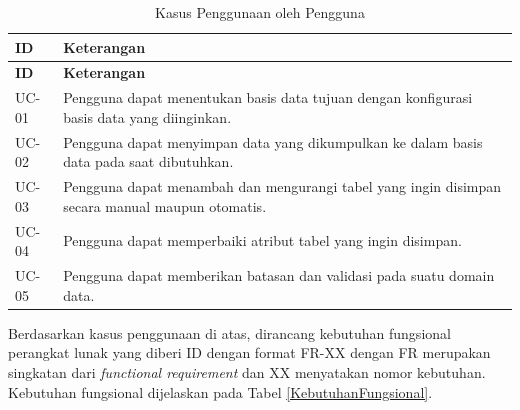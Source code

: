 	\begin{small}
	\begin{longtable}{ | p{2cm} | p{10cm} | }
	    \caption{Kasus Penggunaan oleh Pengguna}
	    \label{KebutuhanPengguna}\\ \hline
	    \centering\bfseries{ID} & \centering\bfseries{Keterangan} \tabularnewline \hline
	    \endfirsthead
	    \hline
	    \centering\bfseries{ID} & \centering\bfseries{Keterangan} \tabularnewline \hline
	    \endhead
	    UC-01 & Pengguna dapat menentukan basis data tujuan dengan konfigurasi basis data yang diinginkan. \\ \hline
	    UC-02 & Pengguna dapat menyimpan data yang dikumpulkan ke dalam basis data pada saat dibutuhkan. \\ \hline
	    UC-03 & Pengguna dapat menambah dan mengurangi tabel yang ingin disimpan secara manual maupun otomatis. \\ \hline
	    UC-04 & Pengguna dapat memperbaiki atribut tabel yang ingin disimpan. \\ \hline
	    UC-05 & Pengguna dapat memberikan batasan dan validasi pada suatu domain data. \\ \hline
	\end{longtable}
	\end{small}

	Berdasarkan kasus penggunaan di atas, dirancang kebutuhan fungsional perangkat lunak yang diberi ID dengan format FR-XX dengan FR merupakan singkatan dari \textit{functional requirement} dan XX menyatakan nomor kebutuhan. Kebutuhan fungsional dijelaskan pada Tabel \ref{KebutuhanFungsional}.

